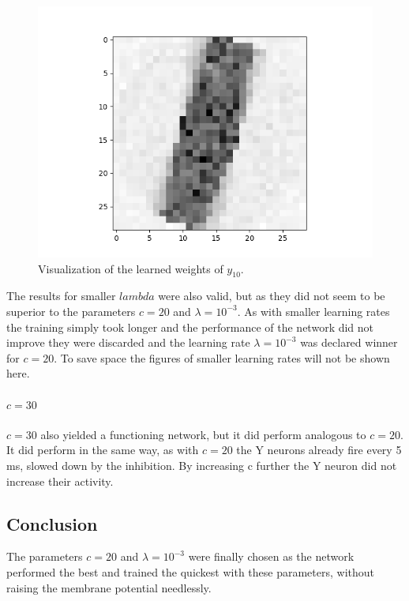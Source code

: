\begin{figure}
  \includegraphics[width=\linewidth]{figures/angleNetwork/c20_3weights2.png}
  \caption{Visualization of the learned weights of $y_10$.}
  \label{fig:c20_3weights2.png}
\end{figure}

The results for smaller $lambda$ were also valid, but as they did not seem to be superior to the parameters $c = 20$ and $\lambda = 10^{-3}$. As with smaller learning rates the training simply took longer and the performance of the network did not improve they were discarded and  the learning rate $\lambda = 10^{-3}$ was declared winner for $c = 20$. To save space the figures of smaller learning rates will not be shown here.

\paragraph{$c = 30$}
$c = 30$ also yielded a functioning network, but it did perform analogous to $c = 20$. It did perform in the same way, as with $c = 20$ the Y neurons already fire every 5 ms, slowed down by the inhibition. By increasing c further the Y neuron did not increase their activity.

\subsection{Conclusion}

The parameters $c = 20$ and $\lambda = 10^{-3}$ were finally chosen as the network performed the best and trained the quickest with these parameters, without raising the membrane potential needlessly.

